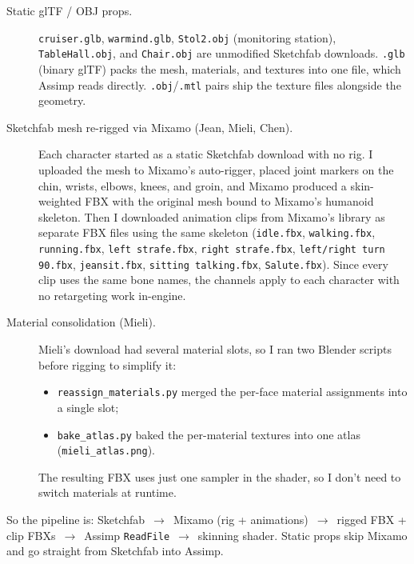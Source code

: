 \documentclass[11pt,a4paper]{article}
\begin{document}
\begin{description}
  \item[Static glTF / OBJ props.]
        \texttt{cruiser.glb}, \texttt{warmind.glb},
        \texttt{Stol2.obj} (monitoring station),
        \texttt{TableHall.obj}, and \texttt{Chair.obj} are unmodified Sketchfab
        downloads. \texttt{.glb} (binary glTF) packs the mesh, materials,
        and textures into one file, which Assimp reads directly.
        \texttt{.obj}/\texttt{.mtl} pairs ship the texture files alongside
        the geometry.
  \item[Sketchfab mesh re-rigged via Mixamo (Jean, Mieli, Chen).]
        Each character started as a static Sketchfab download with no rig.
        I uploaded the mesh to Mixamo's auto-rigger, placed joint markers
        on the chin, wrists, elbows, knees, and groin, and Mixamo produced
        a skin-weighted FBX with the original mesh bound to Mixamo's
        humanoid skeleton.
        Then I downloaded animation clips from Mixamo's library as separate
        FBX files using the same skeleton (\texttt{idle.fbx},
        \texttt{walking.fbx}, \texttt{running.fbx},
        \texttt{left strafe.fbx}, \texttt{right strafe.fbx},
        \texttt{left/right turn 90.fbx}, \texttt{jeansit.fbx},
        \texttt{sitting talking.fbx}, \texttt{Salute.fbx}).
        Since every clip uses the same bone names, the channels apply to
        each character with no retargeting work in-engine.
  \item[Material consolidation (Mieli).]
        Mieli's download had several material slots, so I ran two Blender
        scripts before rigging to simplify it:
        \begin{itemize}
          \item \texttt{reassign\_materials.py} merged the per-face material
                assignments into a single slot;
          \item \texttt{bake\_atlas.py} baked the per-material textures
                into one atlas (\texttt{mieli\_atlas.png}).
        \end{itemize}
        The resulting FBX uses just one sampler in the shader, so I don't
        need to switch materials at runtime.
\end{description}

So the pipeline is: Sketchfab~$\to$~Mixamo (rig + animations)~$\to$~rigged
FBX + clip FBXs~$\to$~Assimp \texttt{ReadFile}~$\to$~skinning shader. Static
props skip Mixamo and go straight from Sketchfab into Assimp.
\end{document}
